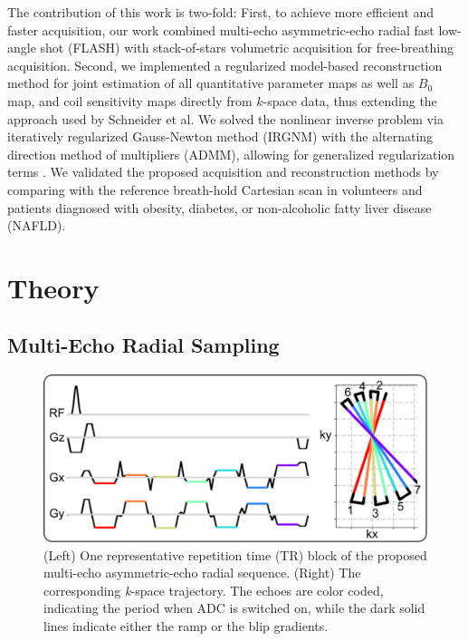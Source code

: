 \documentclass[journal,twoside,web]{ieeecolor}
\begin{document}
The contribution of this work is two-fold:
First, to achieve more efficient and faster acquisition, 
our work combined multi-echo asymmetric-echo radial fast low-angle shot (FLASH) 
with stack-of-stars volumetric acquisition \cite{block_2014_rad}
for free-breathing acquisition. 
Second, we implemented a regularized model-based reconstruction method 
for joint estimation of all quantitative parameter maps as well as
$B_0$ map, and coil sensitivity maps directly from $k$-space data,
thus extending the approach used by Schneider et al.
We solved the nonlinear inverse problem via 
iteratively regularized Gauss-Newton method (IRGNM) \cite{uecker_2008_nlinv} 
with the alternating direction method of multipliers (ADMM), 
allowing for generalized regularization terms \cite{boyd_2010_admm}. 
We validated the proposed acquisition and reconstruction methods by 
comparing with the reference breath-hold Cartesian scan \cite{zhong_2014_wfadafit} 
in volunteers and patients diagnosed with obesity, diabetes, or non-alcoholic fatty liver disease (NAFLD). 



\section{Theory}

\subsection{Multi-Echo Radial Sampling}

\begin{figure}
	\centering
	\includegraphics[width=\columnwidth]{../../figures/tan1.pdf}
	\caption{(Left) One representative repetition time (TR) block of 
		the proposed multi-echo asymmetric-echo radial sequence. 
		(Right) The corresponding \textit{k}-space trajectory. 
		The echoes are color coded, indicating the period when ADC is switched on, 
		while the dark solid lines indicate either the ramp or the blip gradients.}
	\label{FIG:SEQ}
\end{figure}
\end{document}
